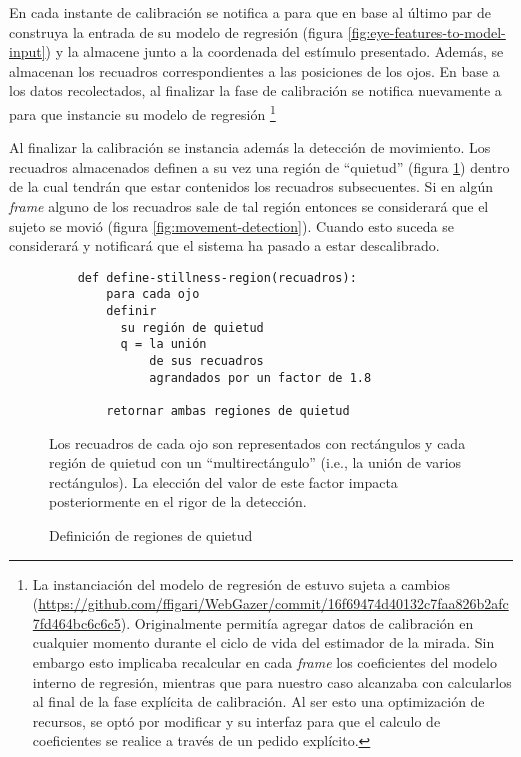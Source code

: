   En cada instante de calibración se notifica a \webgazer para que en base al
  último par de \features construya la entrada de su modelo de regresión
  (figura \ref{fig:eye-features-to-model-input}) y la almacene junto a la
  coordenada del estímulo presentado.
  Además, se almacenan los recuadros correspondientes a las posiciones de los
  ojos.
  En base a los datos recolectados, al finalizar la fase de calibración se
  notifica nuevamente a \webgazer para que instancie su modelo de regresión
  \footnote{
    La instanciación del modelo de regresión de \webgazer estuvo sujeta a
    cambios
    (\url{https://github.com/ffigari/WebGazer/commit/16f69474d40132c7faa826b2afc7fd464bc6c6c5}).
    Originalmente \webgazer permitía agregar datos de calibración en cualquier
    momento durante el ciclo de vida del estimador de la mirada.
    Sin embargo esto implicaba recalcular en cada \textit{frame} los coeficientes
    del modelo interno de regresión, mientras que para nuestro caso alcanzaba con
    calcularlos al final de la fase explícita de calibración.
    Al ser esto una optimización de recursos, se optó por modificar \webgazer y su
    interfaz para que el calculo de coeficientes se realice a través de un pedido
    explícito.
  }

  Al finalizar la calibración se instancia además la detección de movimiento.
  Los recuadros almacenados definen a su vez una región de ``quietud'' (figura
  \ref{fig:features-to-stillnes-region}) dentro de la cual tendrán que estar
  contenidos los recuadros subsecuentes.
  Si en algún \textit{frame} alguno de los recuadros sale de tal región
  entonces se considerará que el sujeto se movió (figura
  \ref{fig:movement-detection}).
  Cuando esto suceda se considerará y notificará que el sistema ha pasado a 
  estar descalibrado.

  \begin{figure}
    \begin{verbatim}
    def define-stillness-region(recuadros):
        para cada ojo
        definir
          su región de quietud
          q = la unión
              de sus recuadros
              agrandados por un factor de 1.8

        retornar ambas regiones de quietud\end{verbatim}
    Los recuadros de cada ojo son representados con rectángulos y cada
    región de quietud con un ``multirectángulo'' (i.e., la unión de varios
    rectángulos).
    La elección del valor de este factor impacta posteriormente en el rigor de
    la detección.
    \caption{Definición de regiones de quietud}
    \label{fig:features-to-stillnes-region}
  \end{figure}

